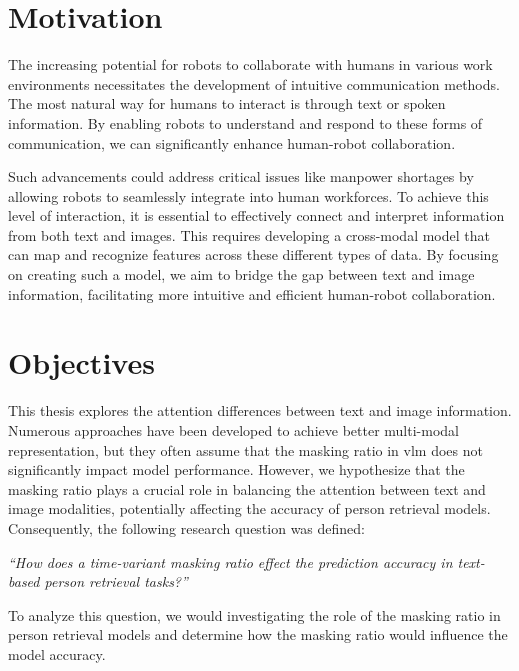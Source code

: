 \section{Motivation}
The increasing potential for robots to collaborate with humans in various work environments necessitates the development of intuitive communication methods. The most natural way for humans to interact is through text or spoken information. By enabling robots to understand and respond to these forms of communication, we can significantly enhance human-robot collaboration.

Such advancements could address critical issues like manpower shortages by allowing robots to seamlessly integrate into human workforces. To achieve this level of interaction, it is essential to effectively connect and interpret information from both text and images. This requires developing a cross-modal model that can map and recognize features across these different types of data. By focusing on creating such a model, we aim to bridge the gap between text and image information, facilitating more intuitive and efficient human-robot collaboration.

\section{Objectives}
This thesis explores the attention differences between text and image information. Numerous approaches have been developed to achieve better multi-modal representation, but they often assume that the masking ratio in \acrshort{vlm} does not significantly impact model performance. However, we hypothesize that the masking ratio plays a crucial role in balancing the attention between text and image modalities, potentially affecting the accuracy of person retrieval models. Consequently, the following research question was defined:

\bigskip
\textit{“How does a time-variant masking ratio effect the prediction accuracy in text-based person retrieval tasks?”}
\bigskip

To analyze this question, we would investigating the role of the masking ratio in person retrieval models and determine how the masking ratio would influence the model accuracy.



